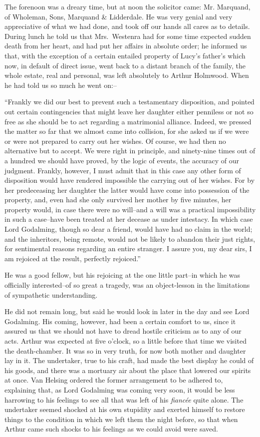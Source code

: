 \documentclass[12pt,openright]{book}
\begin{document}
The forenoon was a dreary time, but at noon the solicitor came: Mr. Marquand, of Wholeman, Sons, Marquand \& Lidderdale. He was very genial and very appreciative of what we had done, and took off our hands all cares as to details. During lunch he told us that Mrs. Westenra had for some time expected sudden death from her heart, and had put her affairs in absolute order; he informed us that, with the exception of a certain entailed property of Lucy’s father’s which now, in default of direct issue, went back to a distant branch of the family, the whole estate, real and personal, was left absolutely to Arthur Holmwood. When he had told us so much he went on:–

“Frankly we did our best to prevent such a testamentary disposition, and pointed out certain contingencies that might leave her daughter either penniless or not so free as she should be to act regarding a matrimonial alliance. Indeed, we pressed the matter so far that we almost came into collision, for she asked us if we were or were not prepared to carry out her wishes. Of course, we had then no alternative but to accept. We were right in principle, and ninety-nine times out of a hundred we should have proved, by the logic of events, the accuracy of our judgment. Frankly, however, I must admit that in this case any other form of disposition would have rendered impossible the carrying out of her wishes. For by her predeceasing her daughter the latter would have come into possession of the property, and, even had she only survived her mother by five minutes, her property would, in case there were no will–and a will was a practical impossibility in such a case–have been treated at her decease as under intestacy. In which case Lord Godalming, though so dear a friend, would have had no claim in the world; and the inheritors, being remote, would not be likely to abandon their just rights, for sentimental reasons regarding an entire stranger. I assure you, my dear sirs, I am rejoiced at the result, perfectly rejoiced.”

He was a good fellow, but his rejoicing at the one little part–in which he was officially interested–of so great a tragedy, was an object-lesson in the limitations of sympathetic understanding.

He did not remain long, but said he would look in later in the day and see Lord Godalming. His coming, however, had been a certain comfort to us, since it assured us that we should not have to dread hostile criticism as to any of our acts. Arthur was expected at five o’clock, so a little before that time we visited the death-chamber. It was so in very truth, for now both mother and daughter lay in it. The undertaker, true to his craft, had made the best display he could of his goods, and there was a mortuary air about the place that lowered our spirits at once. Van Helsing ordered the former arrangement to be adhered to, explaining that, as Lord Godalming was coming very soon, it would be less harrowing to his feelings to see all that was left of his \textit{fiancée} quite alone. The undertaker seemed shocked at his own stupidity and exerted himself to restore things to the condition in which we left them the night before, so that when Arthur came such shocks to his feelings as we could avoid were saved.
\end{document}
